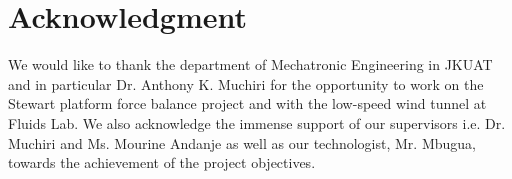 \section*{Acknowledgment}
We would like to thank the department of Mechatronic Engineering in JKUAT and in
particular Dr. Anthony K. Muchiri for the opportunity to work on the Stewart platform
force balance project and with the low-speed wind tunnel at Fluids Lab. We also acknowledge
the immense support of our supervisors i.e. Dr. Muchiri and Ms. Mourine
Andanje as well as our technologist, Mr. Mbugua, towards the achievement of the project
objectives.


